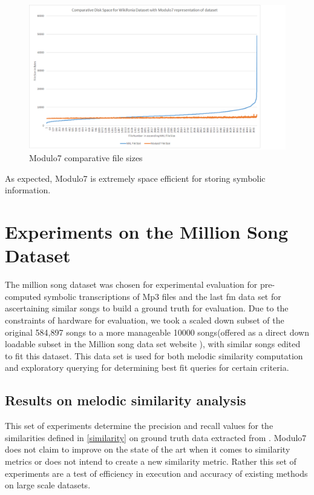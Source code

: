 \begin{figure}
\centering
\includegraphics[width=\textwidth]{M7Graph.png}
\makeatletter
\let\@currsize\normalsize
\caption{Modulo7 comparative file sizes}
\label{fig:filesizes}
\end{figure}

\noindent As expected, Modulo7 is extremely space efficient for storing symbolic information.
\section{Experiments on the Million Song Dataset}

\noindent The million song dataset was chosen for experimental evaluation \cite{msd} for pre-computed symbolic transcriptions of Mp3 files and the last fm data set for ascertaining similar songs to build a ground truth for evaluation. Due to the constraints of hardware for evaluation, we took a scaled down subset of the original 584,897 songs to a more manageable 10000 songs(offered as a direct down loadable subset in the Million song data set website \cite{msddownloadable}), with similar songs edited to fit this dataset. This data set is used for both melodic similarity computation and exploratory querying for determining best fit queries for certain criteria.

\subsection{Results on melodic similarity analysis}

\noindent This set of experiments determine the precision and recall values for the similarities defined in \ref{similarity} on ground truth data extracted from \cite{msd}. Modulo7 does not claim to improve on the state of the art when it comes to similarity metrics or does not intend to create a new similarity metric. Rather this set of experiments are a test of efficiency in execution and accuracy of existing methods on large scale datasets. \\

